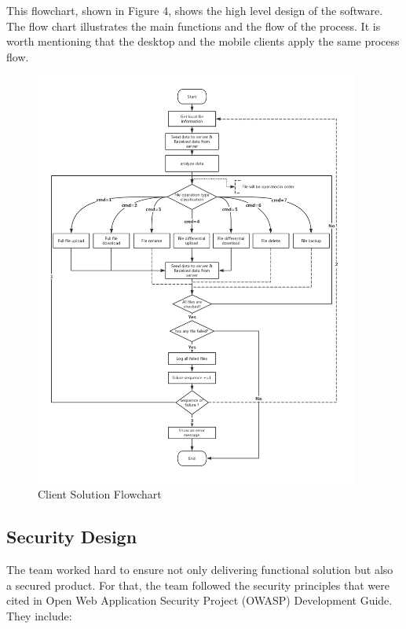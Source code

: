 \documentclass{article}
\begin{document}
\hfill \break
This flowchart, shown in Figure 4, shows the high level design of the software. The flow chart illustrates the main functions and the flow of the process. It is worth mentioning that the desktop and the mobile clients apply the same process flow.

\begin{figure}[H]
    \centering
    \includegraphics[width=0.95\textwidth]{flowchart}
    \caption{Client Solution Flowchart}
    \label{fig:flowchart1}
\end{figure}

\hfill \break

\subsection{Security Design}

The team worked hard to ensure not only delivering functional solution but also a secured product. For that, the team followed the security principles that were cited in Open Web Application Security Project (OWASP) Development Guide. They include:
\end{document}
